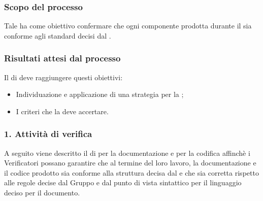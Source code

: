 \subsubsection{Scopo del processo}
Tale  ha come obiettivo confermare che ogni componente prodotta durante il  sia conforme agli standard decisi dal .
\subsubsection{Risultati attesi dal processo}
Il  di  deve raggiungere questi obiettivi:
\begin{itemize}
\item Individuazione e applicazione di una strategia per la ;
\item I criteri che la  deve accertare.
\end{itemize}

\subsubsection{1. Attivit\`a di verifica}
A seguito viene descritto il  di  per la documentazione e per la codifica affinchè i Verificatori possano garantire che al termine del loro lavoro, la documentazione e il codice prodotto sia conforme alla struttura decisa dal  e che sia corretta rispetto alle regole decise dal Gruppo e dal punto di vista sintattico per il linguaggio deciso per il documento.

